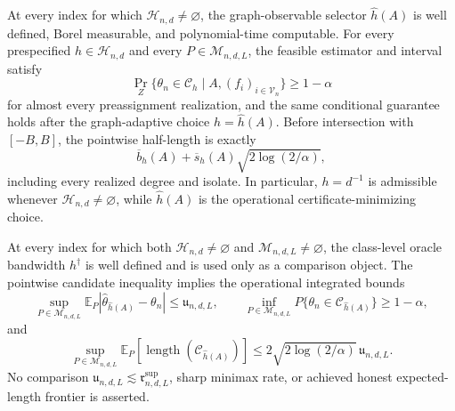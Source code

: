 At every index for which \(\mathcal H_{n,d}\ne\varnothing\), the graph-observable selector \(\widehat h(A)\) is well defined, Borel measurable, and polynomial-time computable.  For every prespecified \(h\in\mathcal H_{n,d}\) and every \(P\in\mathcal M_{n,d,L}\), the feasible estimator and interval satisfy
\[
 \Pr_Z\{\theta_n\in\mathcal C_h\mid A,(f_i)_{i\in\mathcal V_n}\}\geq1-\alpha
\]
for almost every preassignment realization, and the same conditional guarantee holds after the graph-adaptive choice \(h=\widehat h(A)\).  Before intersection with \([-B,B]\), the pointwise half-length is exactly
\[
 \overline b_h(A)+\overline s_h(A)\sqrt{2\log(2/\alpha)},
\]
including every realized degree and isolate.  In particular, \(h=d^{-1}\) is admissible whenever \(\mathcal H_{n,d}\ne\varnothing\), while \(\widehat h(A)\) is the operational certificate-minimizing choice.

At every index for which both \(\mathcal H_{n,d}\ne\varnothing\) and \(\mathcal M_{n,d,L}\ne\varnothing\), the class-level oracle bandwidth \(h^\dagger\) is well defined and is used only as a comparison object.  The pointwise candidate inequality implies the operational integrated bounds
\[
 \sup_{P\in\mathcal M_{n,d,L}}
 \mathbb E_P|\widehat\theta_{\widehat h(A)}-\theta_n|
 \leq\mathfrak u_{n,d,L},
 \qquad
 \inf_{P\in\mathcal M_{n,d,L}}
 P\{\theta_n\in\mathcal C_{\widehat h(A)}\}\geq1-\alpha,
\]
and
\[
 \sup_{P\in\mathcal M_{n,d,L}}
 \mathbb E_P[\operatorname{length}(\mathcal C_{\widehat h(A)})]
 \leq2\sqrt{2\log(2/\alpha)}\,\mathfrak u_{n,d,L}.
\]
No comparison \(\mathfrak u_{n,d,L}\lesssim\mathfrak r^{\mathrm{sup}}_{n,d,L}\), sharp minimax rate, or achieved honest expected-length frontier is asserted.